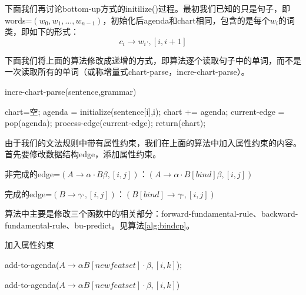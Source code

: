 \documentclass{article}
\begin{document}
\begin{CJK}{UTF8}{gbsn}
下面我们再讨论bottom-up方式的initilize()过程。最初我们已知的只是句子，即words=$(w_0,w_1,\ldots,w_{n-1})$，初始化后agenda和chart相同，包含的是每个$w_i$的词类，即如下的形式：
\[
c_i\to w_i\cdot, [i,i+1]
\]

下面我们将上面的算法修改成递增的方式，即算法逐个读取句子中的单词，而不是一次读取所有的单词（或称增量式chart-parse，incre-chart-parse）。

\begin{algorithm}
\caption{incre-chart-parse(sentence,grammar)}
\begin{algorithmic}
\STATE chart=空;
\STATE agenda = initialize(sentence[i],i);
\STATE chart += agenda;
\STATE current-edge = pop(agenda);
\STATE process-edge(current-edge);
\ENDWHILE
\ENDFOR
\STATE return(chart);
\end{algorithmic}
\label{alg:cpincre}
\end{algorithm}

由于我们的文法规则中带有属性约束，我们在上面的算法中加入属性约束的内容。首先要修改数据结构edge，添加属性约束。
\begin{itemize*}
\item 非完成的edge=$(A\to \alpha\cdot B\beta,[i,j])$：$(A\to \alpha\cdot B[bind]\beta,[i,j])$
\item 完成的edge=$(B\to \gamma\cdot,[i,j])$：$(B[bind]\to \gamma \cdot,[i,j])$
\end{itemize*}
算法中主要是修改三个函数中的相关部分：forward-fundamental-rule、backward-fundamental-rule、bu-predict。见算法\ref{alg:bindcp}。

\begin{algorithm}
\caption{加入属性约束}
\begin{algorithmic}
\STATE add-to-agenda($A\to \alpha B[newfeatset] \cdot \beta,[i,k]$);
\ENDIF
\ENDFOR
\end{algorithmic}

\vspace{1pc}
\begin{algorithmic}
\STATE add-to-agenda($A\to \alpha B[newfeatset] \cdot \beta,[i,k]$)
\ENDIF
\ENDFOR
\end{algorithmic}


\end{algorithm}
\end{CJK}
\end{document}
